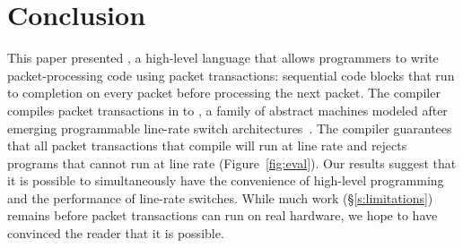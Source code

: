 \section{Conclusion}
\label{s:conclusion}

This paper presented \pktlanguage, a high-level language that allows
programmers to write packet-processing code using packet transactions:
sequential code blocks that run to completion on every packet before processing
the next packet. The \pktlanguage compiler compiles packet transactions in
\pktlanguage to \absmachine, a family of abstract machines modeled after
emerging programmable line-rate switch architectures~\cite{flexpipe, xpliant,
rmt}. The compiler guarantees that all packet transactions that compile will
run at line rate and rejects \pktlanguage programs that cannot run at line rate
(Figure~\ref{fig:eval}). Our results suggest that it is possible to
simultaneously have the convenience of high-level programming and the
performance of line-rate switches. While much work (\S\ref{s:limitations})
remains before packet transactions can run on real hardware, we hope to have
convinced the reader that it is possible.
